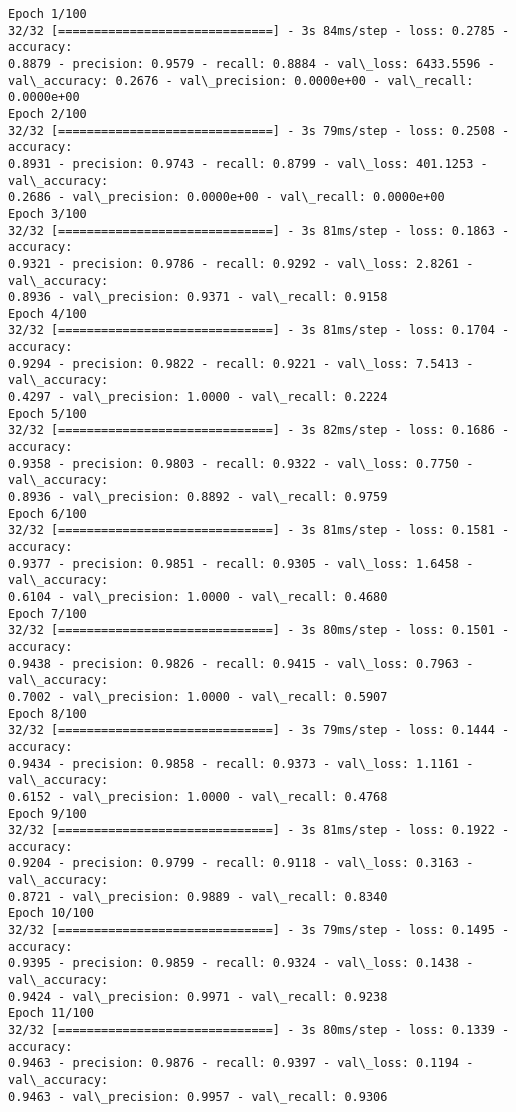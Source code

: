 \documentclass[11pt]{article}
\begin{document}
    \begin{Verbatim}[commandchars=\\\{\}]
Epoch 1/100
32/32 [==============================] - 3s 84ms/step - loss: 0.2785 - accuracy:
0.8879 - precision: 0.9579 - recall: 0.8884 - val\_loss: 6433.5596 -
val\_accuracy: 0.2676 - val\_precision: 0.0000e+00 - val\_recall: 0.0000e+00
Epoch 2/100
32/32 [==============================] - 3s 79ms/step - loss: 0.2508 - accuracy:
0.8931 - precision: 0.9743 - recall: 0.8799 - val\_loss: 401.1253 - val\_accuracy:
0.2686 - val\_precision: 0.0000e+00 - val\_recall: 0.0000e+00
Epoch 3/100
32/32 [==============================] - 3s 81ms/step - loss: 0.1863 - accuracy:
0.9321 - precision: 0.9786 - recall: 0.9292 - val\_loss: 2.8261 - val\_accuracy:
0.8936 - val\_precision: 0.9371 - val\_recall: 0.9158
Epoch 4/100
32/32 [==============================] - 3s 81ms/step - loss: 0.1704 - accuracy:
0.9294 - precision: 0.9822 - recall: 0.9221 - val\_loss: 7.5413 - val\_accuracy:
0.4297 - val\_precision: 1.0000 - val\_recall: 0.2224
Epoch 5/100
32/32 [==============================] - 3s 82ms/step - loss: 0.1686 - accuracy:
0.9358 - precision: 0.9803 - recall: 0.9322 - val\_loss: 0.7750 - val\_accuracy:
0.8936 - val\_precision: 0.8892 - val\_recall: 0.9759
Epoch 6/100
32/32 [==============================] - 3s 81ms/step - loss: 0.1581 - accuracy:
0.9377 - precision: 0.9851 - recall: 0.9305 - val\_loss: 1.6458 - val\_accuracy:
0.6104 - val\_precision: 1.0000 - val\_recall: 0.4680
Epoch 7/100
32/32 [==============================] - 3s 80ms/step - loss: 0.1501 - accuracy:
0.9438 - precision: 0.9826 - recall: 0.9415 - val\_loss: 0.7963 - val\_accuracy:
0.7002 - val\_precision: 1.0000 - val\_recall: 0.5907
Epoch 8/100
32/32 [==============================] - 3s 79ms/step - loss: 0.1444 - accuracy:
0.9434 - precision: 0.9858 - recall: 0.9373 - val\_loss: 1.1161 - val\_accuracy:
0.6152 - val\_precision: 1.0000 - val\_recall: 0.4768
Epoch 9/100
32/32 [==============================] - 3s 81ms/step - loss: 0.1922 - accuracy:
0.9204 - precision: 0.9799 - recall: 0.9118 - val\_loss: 0.3163 - val\_accuracy:
0.8721 - val\_precision: 0.9889 - val\_recall: 0.8340
Epoch 10/100
32/32 [==============================] - 3s 79ms/step - loss: 0.1495 - accuracy:
0.9395 - precision: 0.9859 - recall: 0.9324 - val\_loss: 0.1438 - val\_accuracy:
0.9424 - val\_precision: 0.9971 - val\_recall: 0.9238
Epoch 11/100
32/32 [==============================] - 3s 80ms/step - loss: 0.1339 - accuracy:
0.9463 - precision: 0.9876 - recall: 0.9397 - val\_loss: 0.1194 - val\_accuracy:
0.9463 - val\_precision: 0.9957 - val\_recall: 0.9306

\end{Verbatim}
\end{document}
